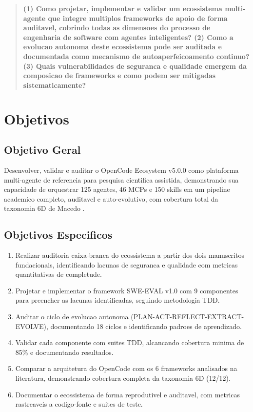\documentclass[12pt,a4paper,oneside,sumario=tradicional,chapter=TITLE,section=TITLE,subsection=TITLE,english,brazil]{abntex2}
\begin{document}
\begin{quote}
\textbf{(1) Como projetar, implementar e validar um ecossistema multi-agente que integre multiplos frameworks de apoio de forma auditavel, cobrindo todas as dimensoes do processo de engenharia de software com agentes inteligentes? (2) Como a evolucao autonoma deste ecossistema pode ser auditada e documentada como mecanismo de autoaperfeicoamento continuo? (3) Quais vulnerabilidades de seguranca e qualidade emergem da composicao de frameworks e como podem ser mitigadas sistematicamente?}
\end{quote}

\section{Objetivos}

\subsection{Objetivo Geral}

Desenvolver, validar e auditar o OpenCode Ecosystem v5.0.0 como plataforma multi-agente de referencia para pesquisa cientifica assistida, demonstrando sua capacidade de orquestrar 125 agentes, 46 MCPs e 150 skills em um pipeline academico completo, auditavel e auto-evolutivo, com cobertura total da taxonomia 6D de Macedo \cite{macedo2026fromprompt}.

\subsection{Objetivos Especificos}

\begin{enumerate}[label=OE\arabic*:,leftmargin=*]
  \item Realizar auditoria caixa-branca do ecossistema a partir dos dois manuscritos fundacionais, identificando lacunas de seguranca e qualidade com metricas quantitativas de completude.
  \item Projetar e implementar o framework SWE-EVAL v1.0 com 9 componentes para preencher as lacunas identificadas, seguindo metodologia TDD.
  \item Auditar o ciclo de evolucao autonoma (PLAN-ACT-REFLECT-EXTRACT-EVOLVE), documentando 18 ciclos e identificando padroes de aprendizado.
  \item Validar cada componente com suites TDD, alcancando cobertura minima de 85\% e documentando resultados.
  \item Comparar a arquitetura do OpenCode com os 6 frameworks analisados na literatura, demonstrando cobertura completa da taxonomia 6D (12/12).
  \item Documentar o ecossistema de forma reprodutivel e auditavel, com metricas rastreaveis a codigo-fonte e suites de teste.
\end{enumerate}
\end{document}
